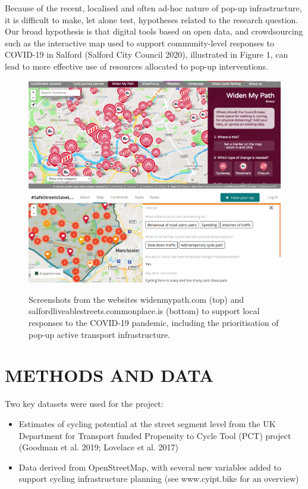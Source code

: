 \documentclass[
]{article}
\providecommand{\tightlist}{%
  \setlength{\itemsep}{0pt}\setlength{\parskip}{0pt}}
\begin{document}
Because of the recent, localised and often ad-hoc nature of pop-up infrastructure, it is difficult to make, let alone test, hypotheses related to the research question.
Our broad hypothesis is that digital tools based on open data, and crowdsourcing such as the interactive map used to support community-level responses to COVID-19 in Salford (Salford City Council 2020), illustrated in Figure 1, can lead to more effective use of resources allocated to pop-up interventions.

\begin{figure}
\includegraphics[width=1\linewidth]{figures/widenmypath-bristol} \includegraphics[width=1\linewidth]{figures/saferstreets} \caption{Screenshots from the websites widenmypath.com (top) and salfordliveablestreets.commonplace.is (bottom) to support local responses to the COVID-19 pandemic, including the prioritisation of pop-up active transport infrastructure.}\label{fig:commonplace}
\end{figure}

\hypertarget{methods-and-data}{%
\section{METHODS AND DATA}\label{methods-and-data}}

Two key datasets were used for the project:

\begin{itemize}
\tightlist
\item
  Estimates of cycling potential at the street segment level from the UK Department for Transport funded Propensity to Cycle Tool (PCT) project (Goodman et al. 2019; Lovelace et al. 2017)
\item
  Data derived from OpenStreetMap, with several new variables added to support cycling infrastructure planning (see www.cyipt.bike for an overview)
\end{itemize}
\end{document}
